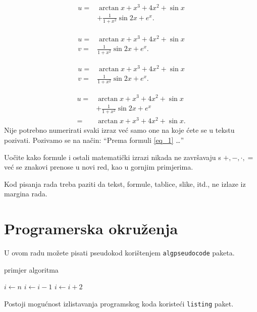 \documentclass{mathos}
\begin{document}
\begin{eqnarray}
\begin{aligned}
    u=&\arctan x +x^3+4x^2+\sin{x}  \\
    &+\frac{1}{1 + x^2} \sin{2x}+e^x.
\end{aligned}
\end{eqnarray}

\begin{align*}
    u=&\arctan x +x^3+4x^2+\sin{x}  \\
    v=&\frac{1}{1 + x^2} \sin{2x}+e^x.\label{eef}
\end{align*}

\begin{align}
    u=&\arctan x +x^3+4x^2+\sin{x}  \\
    v=&\frac{1}{1 + x^2} \sin{2x}+e^x.\label{eef}
\end{align}

\begin{align*}
    u=&\arctan x +x^3+4x^2+\sin{x}  \\
    &+\frac{1}{1 + x^2} \sin{2x}+e^x\\
    =&\arctan x +x^3+4x^2+\sin{x}.
\end{align*}
Nije potrebno numerirati svaki izraz već samo one na koje ćete se u tekstu pozivati. Pozivamo se na način: ``Prema formuli \eqref{eq_1} \dots''

\noindent
Uočite kako formule i ostali matematički izrazi nikada ne završavaju s $+,-,\cdot,=$ već se znakovi prenose u novi red, kao u gornjim primjerima.

\noindent
Kod pisanja rada treba paziti da tekst, formule, tablice, slike, itd., ne izlaze iz margina rada.

\section{Programerska okruženja}

U ovom radu možete pisati pseudokod korištenjem \verb+algpseudocode+ paketa.

\begin{algorithm}
\caption{primjer algoritma}
\begin{algorithmic}[1]
\State $i \gets n$
    \State $i \gets i-1$
\Else
        \State $i \gets i+2$
    \EndIf
\EndIf
\EndProcedure
\end{algorithmic}
\end{algorithm}

\noindent
Postoji mogućnost izlistavanja programskog koda koristeći \verb+listing+ paket.
\end{document}
